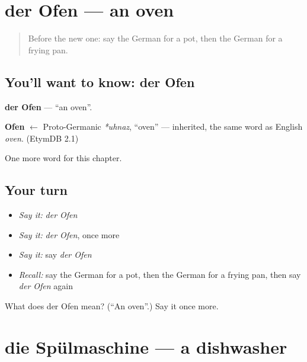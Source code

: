 \section[der Ofen]{der Ofen — an oven}

\label{lesson:GE-C201-ofen}



\begin{quote}
Before the new one: say the German for a pot, then the German for a frying pan.
\end{quote}

\subsection*{You'll want to know: der Ofen}
\textbf{der Ofen} — \textquotedblleft{}an oven\textquotedblright{}.

\begin{cousinweb}
\textbf{Ofen} $\leftarrow$ Proto-Germanic \emph{*uhnaz}, \textquotedblleft{}oven\textquotedblright{} — inherited, the same word as English \emph{oven}. (EtymDB 2.1)
\end{cousinweb}

\begin{grammarlens}[title={What you've built}]
One more word for this chapter.
\end{grammarlens}

\subsection*{Your turn}
\begin{itemize}
\raggedright
  \item \emph{Say it:} \emph{der Ofen}
  \item \emph{Say it:} \emph{der Ofen}, once more
  \item \emph{Say it:} say \emph{der Ofen}
  \item \emph{Recall:} say the German for a pot, then the German for a frying pan, then say \emph{der Ofen} again
\end{itemize}

\begin{tcolorbox}[breakable,colback=teal!4,colframe=teal!35!black,title={Before you move on}]
What does der Ofen mean? (\textquotedblleft{}An oven\textquotedblright{}.) Say it once more.
\end{tcolorbox}
\section[die Spülmaschine]{die Spülmaschine — a dishwasher}

